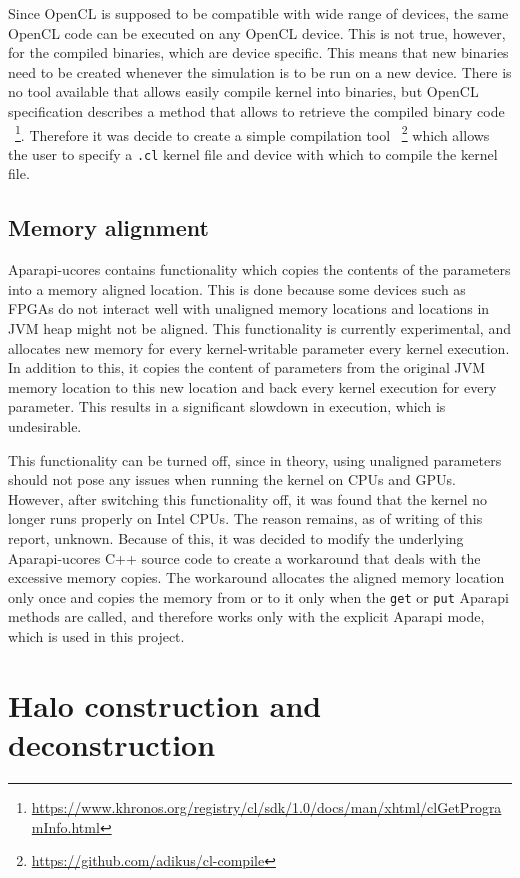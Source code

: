 \documentclass{l4proj}
\begin{document}
Since OpenCL is supposed to be compatible with wide range of devices, the same OpenCL
code can be executed on any OpenCL device. This is not true, however, for the 
compiled binaries, which are device specific. This means that new binaries need to 
be created whenever the simulation is to be run on a new device. There is no
tool available that allows easily compile kernel into binaries, but OpenCL specification
describes a method that allows to retrieve the compiled binary code
~\footnote{\url{https://www.khronos.org/registry/cl/sdk/1.0/docs/man/xhtml/clGetProgramInfo.html}}.
Therefore it was decide to create a simple compilation tool 
~\footnote{\url{https://github.com/adikus/cl-compile}}
which allows the user to specify a \texttt{.cl} kernel file and device with which to
compile the kernel file.

\subsection{Memory alignment}

Aparapi-ucores contains functionality which copies the contents of the parameters
into a memory aligned location. This is done because some devices such as FPGAs
do not interact well with unaligned memory locations and locations in JVM heap
might not be aligned. This functionality is currently experimental, and allocates 
new memory for every kernel-writable parameter every kernel execution. In addition to this,
it copies the content of parameters from the original JVM memory location to this new 
location and back every kernel execution for every parameter. This results in a significant 
slowdown in execution, which is undesirable.

This functionality can be turned off, since in theory, using unaligned parameters
should not pose any issues when running the kernel on CPUs and GPUs. However,
after switching this functionality off, it was found that the kernel no longer runs
properly on Intel CPUs. The reason remains, as of writing of this report, unknown.
Because of this, it was decided to modify the underlying Aparapi-ucores C++ source code
to create a workaround that deals with the excessive memory copies. The workaround
allocates the aligned memory location only once and copies the memory from or to it
only when the \texttt{get} or \texttt{put} Aparapi methods are called, and therefore
works only with the explicit Aparapi mode, which is used in this project.

\section{Halo construction and deconstruction}
\end{document}
